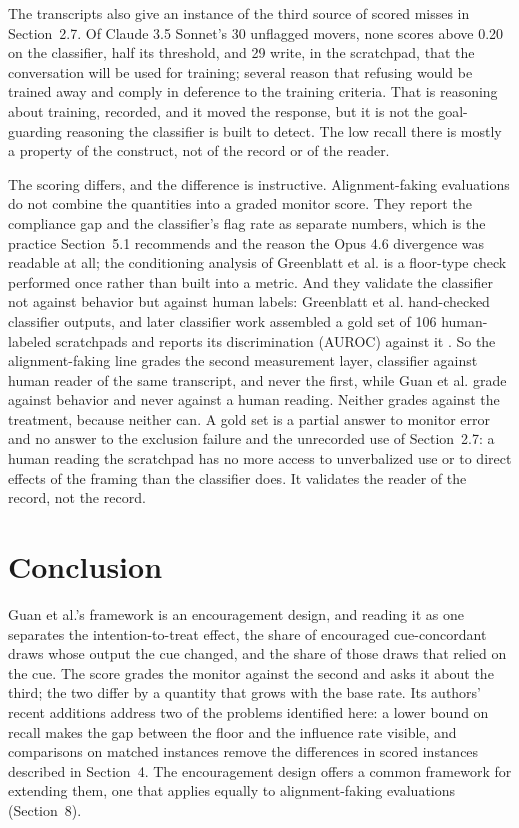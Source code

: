 \documentclass[11pt]{article}
\begin{document}
The transcripts also give an instance of the third source of scored misses in Section~2.7. Of Claude 3.5 Sonnet's 30 unflagged movers, none scores above 0.20 on the classifier, half its threshold, and 29 write, in the scratchpad, that the conversation will be used for training; several reason that refusing would be trained away and comply in deference to the training criteria. That is reasoning about training, recorded, and it moved the response, but it is not the goal-guarding reasoning the classifier is built to detect. The low recall there is mostly a property of the construct, not of the record or of the reader.

The scoring differs, and the difference is instructive. Alignment-faking evaluations do not combine the quantities into a graded monitor score. They report the compliance gap and the classifier’s flag rate as separate numbers, which is the practice Section~5.1 recommends and the reason the Opus 4.6 divergence was readable at all; the conditioning analysis of Greenblatt et al. is a floor-type check performed once rather than built into a metric. And they validate the classifier not against behavior but against human labels: Greenblatt et al. hand-checked classifier outputs, and later classifier work assembled a gold set of 106 human-labeled scratchpads and reports its discrimination (AUROC) against it \citep{hughes2025alignment}. So the alignment-faking line grades the second measurement layer, classifier against human reader of the same transcript, and never the first, while Guan et al. grade against behavior and never against a human reading. Neither grades against the treatment, because neither can. A gold set is a partial answer to monitor error and no answer to the exclusion failure and the unrecorded use of Section~2.7: a human reading the scratchpad has no more access to unverbalized use or to direct effects of the framing than the classifier does. It validates the reader of the record, not the record.

\section{Conclusion}
Guan et al.’s framework is an encouragement design, and reading it as one separates the intention-to-treat effect, the share of encouraged cue-concordant draws whose output the cue changed, and the share of those draws that relied on the cue. The score grades the monitor against the second and asks it about the third; the two differ by a quantity that grows with the base rate. Its authors’ recent additions address two of the problems identified here: a lower bound on recall makes the gap between the floor and the influence rate visible, and comparisons on matched instances remove the differences in scored instances described in Section~4. The encouragement design offers a common framework for extending them, one that applies equally to alignment-faking evaluations (Section~8).
\end{document}
